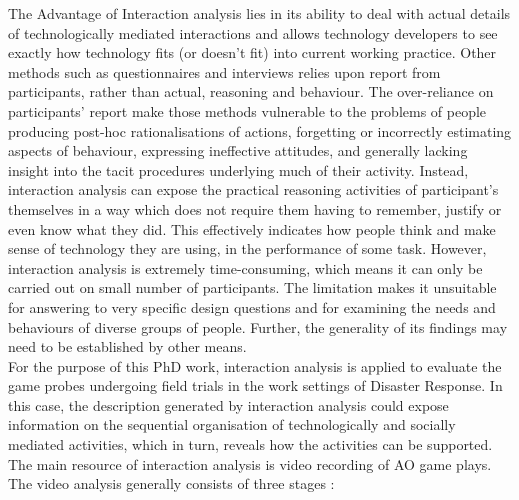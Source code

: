 The Advantage of Interaction analysis lies in its ability to deal with actual details of technologically mediated interactions and allows technology developers to see exactly how technology fits (or doesn't fit) into current working practice. Other methods such as questionnaires and interviews relies upon report from participants, rather than actual, reasoning and behaviour. The over-reliance on participants' report make those methods vulnerable to the problems of people producing post-hoc rationalisations of actions, forgetting or incorrectly estimating aspects of behaviour, expressing ineffective attitudes, and generally lacking insight into the tacit procedures underlying much of their activity. Instead, interaction analysis can expose the practical reasoning activities of participant's themselves in a way which does not require them having to remember, justify or even know what they did. This effectively indicates how people think and make sense of technology they are using, in the performance of some task. However, interaction analysis is extremely time-consuming, which means it can only be carried out on small number of participants. The limitation makes it unsuitable for answering to very specific design questions and for examining the needs and behaviours of diverse groups of people. Further, the generality of its findings may need to be established by other means.\\

For the purpose of this PhD work, interaction analysis is applied to evaluate the game probes undergoing field trials in the work settings of Disaster Response. In this case, the description generated by interaction analysis could expose information on the sequential organisation of technologically and socially mediated activities, which in turn, reveals how the activities can be supported. The main resource of interaction analysis is video recording of \ac{AO} game plays. The video analysis generally consists of three stages \cite{Heath2010} :

